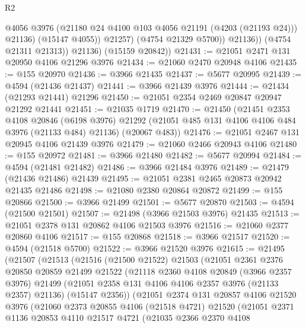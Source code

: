 \begin{lexlean}{R2}
\begin{coremodule}
                      @4056
                      @3976
                      (@21180 @24 @4100 @103 @4056 @21191 (@4203 (@21193 @24)))
                      @21136)
                    (@15147 @4055))
                  @21257)
                (@4754 @21329 @5700))
              @21136))
          (@4754 @21311 @21313))
        @21136)
      (@15159 @20842))
@21431 := @21051 @2471 @131 @20950 @4106 @21296 @3976
@21434 := @21060 @2470 @20948 @4106
@21435 := @155 @20970
@21436 := @3966 @21435
@21437 := @5677 @20995
@21439 := @4594 (@21436 @21437)
@21441 := @3966 @21439 @3976
@21444 := @21434 (@21293 @21441) @21296
@21450 := @21051 @2354 @2469 @20847 @20947 @21292 @21441
@21451 := @21035 @1719
@21470 := @21450
    (@21451
      @2353
      @4108
      @20846
      (@6198 @3976)
      @21292
      (@21051 @485 @131 @4106 @4106 @484 @3976 (@21133 @484) @21136)
      (@20067 @483))
@21476 := @21051 @2467 @131 @20945 @4106 @21439 @3976
@21479 := @21060 @2466 @20943 @4106
@21480 := @155 @20972
@21481 := @3966 @21480
@21482 := @5677 @20994
@21484 := @4594 (@21481 @21482)
@21486 := @3966 @21484 @3976
@21489 := @21479 (@21436 @21486) @21439
@21495 := @21051 @2381 @2465 @20873 @20942 @21435 @21486
@21498 := @21080 @2380 @20864 @20872
@21499 := @155 @20866
@21500 := @3966 @21499
@21501 := @5677 @20870
@21503 := @4594 (@21500 @21501)
@21507 := @21498 (@3966 @21503 @3976) @21435
@21513 := @21051 @2378 @131 @20862 @4106 @21503 @3976
@21516 := @21060 @2377 @20860 @4106
@21517 := @155 @20868
@21518 := @3966 @21517
@21520 := @4594 (@21518 @5700)
@21522 := @3966 @21520 @3976
@21615 := @21495
    (@21507
      (@21513
        (@21516
          (@21500 @21522)
          @21503
          (@21051
            @2361
            @2376
            @20850
            @20859
            @21499
            @21522
            (@21118
              @2360
              @4108
              @20849
              (@3966 @2357 @3976)
              @21499
              (@21051 @2358 @131 @4106 @4106 @2357 @3976 (@21133 @2357) @21136)
              (@15147 @2356))
            (@21051
              @2374
              @131
              @20857
              @4106
              @21520
              @3976
              (@21060
                @2373
                @20855
                @4106
                (@21518 @4721)
                @21520
                (@21051
                  @2371
                  @1136
                  @20853
                  @4110
                  @21517
                  @4721
                  (@21035
                    @2366
                    @2370
                    @4108

\end{coremodule}
\end{lexlean}
